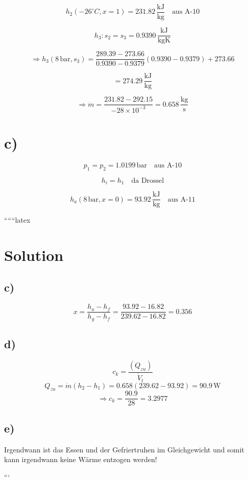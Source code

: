 \[
h_2 (-26^\circ C, x = 1) = 231.82 \, \frac{\text{kJ}}{\text{kg}} \quad \text{aus A-10}
\]

\[
h_3: s_2 = s_3 = 0.9390 \, \frac{\text{kJ}}{\text{kgK}}
\]

\[
\Rightarrow h_3 (8 \, \text{bar}, s_3) = \frac{289.39 - 273.66}{0.9390 - 0.9379} \left(0.9390 - 0.9379\right) + 273.66
\]

\[
= 274.29 \, \frac{\text{kJ}}{\text{kg}}
\]

\[
\Rightarrow \dot{m} = \frac{231.82 - 292.15}{-28 \times 10^{-3}} = 0.658 \, \frac{\text{kg}}{\text{s}}
\]

\section*{c)}

\[
p_1 = p_2 = 1.0199 \, \text{bar} \quad \text{aus A-10}
\]

\[
h_i = h_1 \quad \text{da Drossel}
\]

\[
h_a (8 \, \text{bar}, x = 0) = 93.92 \, \frac{\text{kJ}}{\text{kg}} \quad \text{aus A-11}
\]

``````latex


\section*{Solution}

\subsection*{c)}
\[
x = \frac{h_a - h_f}{h_g - h_f} = \frac{93.92 - 16.82}{239.62 - 16.82} = 0.356
\]

\subsection*{d)}
\[
c_k = \frac{(Q_{zu})}{\dot{V}_t}
\]
\[
Q_{zu} = \dot{m} (h_2 - h_1) = 0.658 (239.62 - 93.92) = 90.9 \, \text{W}
\]
\[
\Rightarrow c_k = \frac{90.9}{28} = 3.2977
\]

\subsection*{e)}
Irgendwann ist das Essen und der Gefriertruhen im Gleichgewicht und somit kann irgendwann keine Wärme entzogen werden!

```